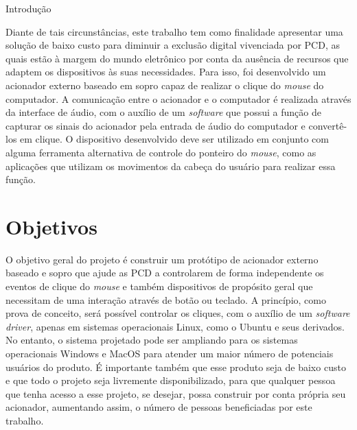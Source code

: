 \begin{chapter}{Introdução}

Diante de tais circunstâncias, este trabalho tem como finalidade apresentar  uma
solução de baixo custo para diminuir a exclusão digital vivenciada por PCD, 
as quais estão à margem do mundo eletrônico por conta da ausência de recursos 
que adaptem os dispositivos às suas necessidades. Para isso, foi desenvolvido 
um acionador externo baseado em sopro capaz de realizar o clique do 
\textit{mouse} do computador. A comunicação entre o acionador e o computador é
realizada através da interface de áudio, com o auxílio de um \textit{software}
que possui a função de capturar os sinais do acionador pela entrada de áudio do
computador e convertê-los em clique. O dispositivo desenvolvido deve ser
utilizado em conjunto com alguma ferramenta alternativa de controle do ponteiro 
do \textit{mouse}, como as aplicações que utilizam os movimentos da cabeça
do usuário para realizar essa função. 


\section{Objetivos}

O objetivo geral do projeto é construir um protótipo de acionador externo
baseado e sopro que ajude as PCD a controlarem de forma independente os eventos
de clique do \textit{mouse} e também dispositivos de propósito geral que
necessitam de uma interação através de botão ou teclado. A princípio, como prova
de conceito, será possível controlar os cliques, com o auxílio de um
\textit{software driver}, apenas em sistemas operacionais Linux, como o Ubuntu e
seus derivados. No entanto, o sistema projetado pode ser ampliando para os
sistemas operacionais Windows e MacOS para atender um maior número de potenciais
usuários do produto. É importante também que esse produto seja de baixo custo e
que todo o projeto seja livremente disponibilizado, para que qualquer pessoa que
tenha acesso a esse projeto, se desejar, possa construir por conta própria seu
acionador, aumentando assim, o número de pessoas beneficiadas por este trabalho.


\end{chapter}
